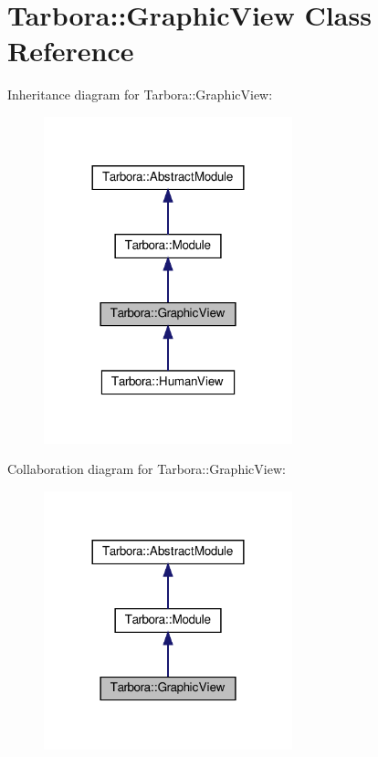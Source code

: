 \hypertarget{classTarbora_1_1GraphicView}{}\section{Tarbora\+:\+:Graphic\+View Class Reference}
\label{classTarbora_1_1GraphicView}


Inheritance diagram for Tarbora\+:\+:Graphic\+View\+:
\nopagebreak
\begin{figure}[H]
\begin{center}
\leavevmode
\includegraphics[width=204pt]{classTarbora_1_1GraphicView__inherit__graph}
\end{center}
\end{figure}


Collaboration diagram for Tarbora\+:\+:Graphic\+View\+:
\nopagebreak
\begin{figure}[H]
\begin{center}
\leavevmode
\includegraphics[width=204pt]{classTarbora_1_1GraphicView__coll__graph}
\end{center}
\end{figure}
